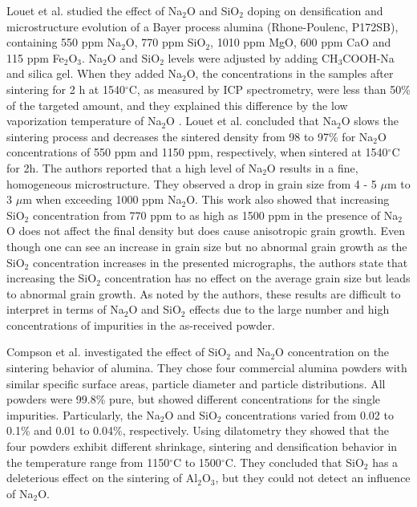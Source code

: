 Louet et al. \cite{Louet2005a} studied the effect of Na$_{2}$O and SiO$_{2}$ doping on densification and microstructure evolution of a Bayer process alumina (Rhone-Poulenc, P172SB), containing 550 ppm Na$_{2}$O, 770 ppm SiO$_{2}$, 1010 ppm MgO, 600 ppm CaO and 115 ppm Fe$_{2}$O$_{3}$. Na$_{2}$O and SiO$_{2}$ levels were adjusted by adding CH$_{3}$COOH-Na and silica gel. When they added Na$_{2}$O, the concentrations in the samples after sintering for 2 h at 1540$^{\circ}$C, as measured by ICP spectrometry, were less than 50\% of the targeted amount, and they explained this difference by the low vaporization temperature of Na$_{2}$O \cite{Louet2005a}. Louet et al. concluded that Na$_{2}$O slows the sintering process and decreases the sintered density from 98 to 97\% for Na$_{2}$O concentrations of 550 ppm and 1150 ppm, respectively, when sintered at 1540$^{\circ}$C for 2h. The authors reported that a high level of Na$_{2}$O results in a fine, homogeneous microstructure. They observed a drop in grain size from 4 - 5 $\mu$m to 3 $\mu$m when exceeding 1000 ppm Na$_{2}$O. This work also showed that increasing SiO$_{2}$ concentration from 770 ppm to as high as 1500 ppm in the presence of Na$_{2}$O does not affect the final density but does cause anisotropic grain growth. Even though one can see an increase in grain size but no abnormal grain growth as the SiO$_{2}$ concentration increases in the presented micrographs, the authors state that increasing the SiO$_{2}$ concentration has no effect on the average grain size but leads to abnormal grain growth. As noted by the authors, these results are difficult to interpret in terms of Na$_{2}$O and SiO$_{2}$ effects due to the large number and high concentrations of impurities in the as-received powder. 

Compson et al. \cite{Compson2013} investigated the effect of SiO$_{2}$ and Na$_{2}$O concentration on the sintering behavior of alumina. They chose four commercial alumina powders with similar specific surface areas, particle diameter and particle distributions. All powders were 99.8\% pure, but showed different concentrations for the single impurities. Particularly, the Na$_{2}$O and SiO$_{2}$ concentrations varied from 0.02 to 0.1\% and 0.01 to 0.04\%, respectively. Using dilatometry they showed that the four powders exhibit different shrinkage, sintering and densification behavior in the temperature range from 1150$^{\circ}$C to 1500$^{\circ}$C. They concluded that SiO$_{2}$ has a deleterious effect on the sintering of Al$_{2}$O$_{3}$, but they could not detect an influence of Na$_{2}$O.

